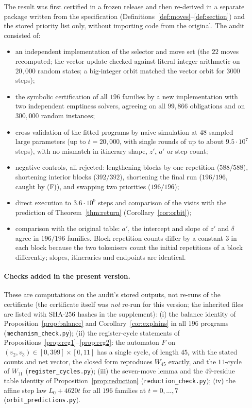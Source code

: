 \documentclass[11pt,a4paper]{article}
\theoremstyle{definition}
\newcommand{\Wa}{W_{45}}
\newcommand{\Wb}{W_{11}}
\begin{document}
The result was first certified in a frozen release \cite{adj4-frozen} and then re-derived in a separate package \cite{adj4-audit} written from the specification (Definitions~\ref{def:moves}--\ref{def:section}) and the stored priority list only, without importing code from the original. The audit consisted of:
\begin{itemize}
\item an independent implementation of the selector and move set (the $22$ moves recomputed; the vector update checked against literal integer arithmetic on $20{,}000$ random states; a big-integer orbit matched the vector orbit for $3000$ steps);
\item the symbolic certification of all $196$ families by a new implementation with two independent emptiness solvers, agreeing on all $99{,}866$ obligations and on $300{,}000$ random instances;
\item cross-validation of the fitted programs by naive simulation at $48$ sampled large parameters (up to $t=20{,}000$, with single rounds of up to about $9.5\cdot10^7$ steps), with no mismatch in itinerary shape, $z'$, $a'$ or step count;
\item negative controls, all rejected: lengthening blocks by one repetition ($588/588$), shortening interior blocks ($392/392$), shortening the final run ($196/196$, caught by (F)), and swapping two priorities ($196/196$);
\item direct execution to $3.6\cdot10^9$ steps and comparison of the visits with the prediction of Theorem~\ref{thm:return} (Corollary~\ref{cor:orbit});
\item comparison with the original table: $a'$, the intercept and slope of $z'$ and $\delta$ agree in $196/196$ families. Block-repetition counts differ by a constant $3$ in each block because the two tokenisers count the initial repetitions of a block differently; slopes, itineraries and endpoints are identical.
\end{itemize}

\paragraph{Checks added in the present version.} These are computations on the audit's stored outputs, not re-runs of the certificate (the certificate itself was \emph{not} re-run for this version; the inherited files are listed with SHA-256 hashes in the supplement): (i) the balance identity of Proposition~\ref{prop:balance} and Corollary~\ref{cor:explains} in all $196$ programs (\texttt{mechanism\_check.py}); (ii) the register-cycle statements of Propositions~\ref{prop:reg1}--\ref{prop:reg2}: the automaton $F$ on $(v_2,v_3)\in[0,399]\times[0,11]$ has a single cycle, of length $45$, with the stated counts and net vector, the closed form reproduces $\Wa$ exactly, and the $11$-cycle of $\Wb$ (\texttt{register\_cycles.py}); (iii) the seven-move lemma and the $49$-residue table identity of Proposition~\ref{prop:reduction} (\texttt{reduction\_check.py}); (iv) the affine step law $L_0+4620t$ for all $196$ families at $t=0,\dots,7$ (\texttt{orbit\_predictions.py}).
\end{document}
